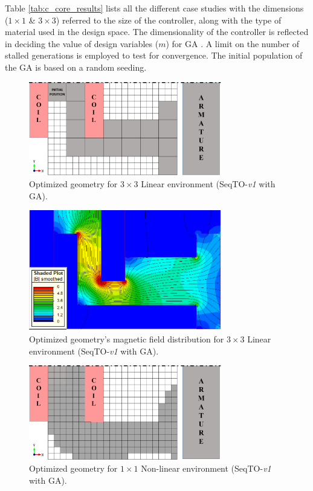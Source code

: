 Table \ref{tab:c_core_results} lists all the different case studies with the dimensions ($1 \times 1$ \& $3 \times 3$) referred to the size of the controller, along with the type of material used in the design space. The dimensionality of the controller is reflected in deciding the value of design variables ($m$) for GA \parencite{matlab} \parencite{GAtoolbox}. A limit on the number of stalled generations is employed to test for convergence. The initial population of the GA is based on a random seeding.

\begin{figure}[h!]
    \centering
    \includegraphics[width=0.75\textwidth]{Figures/Ch_MDP/C-Core_3X3Final.png}
    \caption{Optimized geometry for $3\times3$ Linear environment (SeqTO-\textit{v1} with GA).}
    \label{fig:MDP_3X3_linear_geometry}
\end{figure}

\begin{figure}[h!]
    \centering
    \includegraphics[width=0.75\textwidth]{Figures/Ch_MDP/state_repr_3_Bfield2.png}
    \caption{Optimized geometry's magnetic field distribution for $3\times3$ Linear environment (SeqTO-\textit{v1} with GA).}
    \label{fig:MDP_3X3_linear_Bfields}
\end{figure}

\begin{figure}[h!]
    \centering
    \includegraphics[width=0.75\textwidth]{Figures/Ch_MDP/C_core_1X1_end.png}
    \caption{Optimized geometry for $1\times1$ Non-linear environment (SeqTO-\textit{v1} with GA).}
    \label{fig:MDP_1X1_nonlinear_geometry}
\end{figure}

